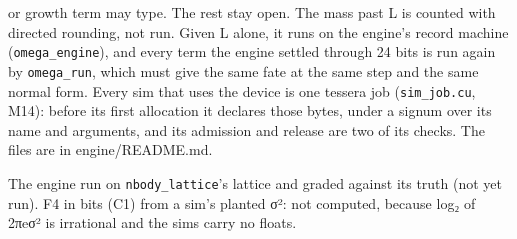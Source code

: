 \begin{description}
or growth term may type. The rest stay open. The mass past L is counted with directed rounding, not run. Given L alone, it runs on the engine's record machine (\texttt{omega\_\allowbreak{}engine}), and every term the engine settled through 24 bits is run again by \texttt{omega\_\allowbreak{}run}, which must give the same fate at the same step and the same normal form. Every sim that uses the device is one tessera job (\texttt{sim\_\allowbreak{}job.\allowbreak{}cu}, M14): before its first allocation it declares those bytes, under a signum over its name and arguments, and its admission and release are two of its checks. The files are in engine/README.md.
\item[{wants}] The engine run on \texttt{nbody\_\allowbreak{}lattice}'s lattice and graded against its truth (not yet run). F4 in bits (C1) from a sim's planted σ²: not computed, because log₂ of 2πeσ² is irrational and the sims carry no floats.

\end{description}

